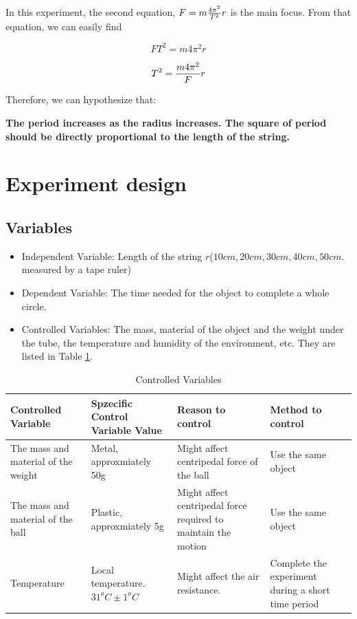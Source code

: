 \documentclass[a4paper]{article}
\begin{document}
In this experiment, the second equation, $F = m {4\pi^2 \over T^2} r$ is the main focus. From that equation, we can easily find

$$FT^2 = m 4\pi^2 r$$

$$T^2 = {m 4\pi^2\over F} r$$

Therefore, we can hypothesize that:

\textbf{The period increases as the radius increases. The square of period should be directly proportional to the length of the string.}

\section{Experiment design}

\subsection{Variables}

\begin{itemize}
    \item Independent Variable: Length of the string $r$($10cm,20cm,30cm,40cm,50cm$. measured by a tape ruler)
    \item Dependent Variable: The time needed for the object to complete a whole circle.
    \item Controlled Variables: The mass, material of the object and the weight under the tube, the temperature and humidity of the environment, etc. They are listed in Table \ref{tab.ctrlvar}.
\end{itemize}

\begin{table}[ht!]
    \centering
    \caption[short]{Controlled Variables}
    \label{tab.ctrlvar}
    \begin{tabularx}{ \textwidth}{X X X X}
    \hline
    \hline
    Controlled Variable          & Spzecific Control Variable Value      & Reason to control                                                    & Method to control                                  \\
    \hline
    The mass and material of the weight &  Metal, approxmiately 50g     & Might affect centripedal force of the ball                           & Use the same object                                \\
    The mass and material of the ball   &  Plastic, approxmiately 5g    & Might affect centripedal force required to maintain the motion       & Use the same object                                \\
    Temperature                  & Local temperature. $31^oC\pm 1^oC$   & Might affect the air resistance.                                     & Complete the experiment during a short time period \\
    \hline
    \hline
    \end{tabularx}
\end{table}
\end{document}
